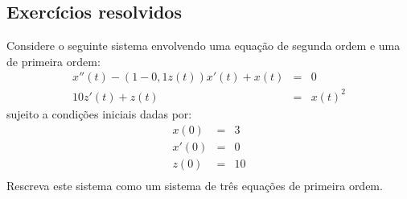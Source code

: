 \subsection*{Exercícios resolvidos}
\begin{exeresol} Considere o seguinte sistema envolvendo uma equação de segunda ordem e uma de primeira ordem:
\begin{eqnarray}
x''(t)-(1- 0,1 z(t))x'(t)+ x(t)&=&0\\
10 z'(t)+z(t)&=&x(t)^2
\end{eqnarray}
sujeito a condições iniciais dadas por:
\begin{eqnarray}
x(0)&=&3\\
x'(0)&=&0\\
z(0)&=&10\\
\end{eqnarray}
Rescreva este sistema como um sistema de três equações de primeira ordem.
\end{exeresol}
